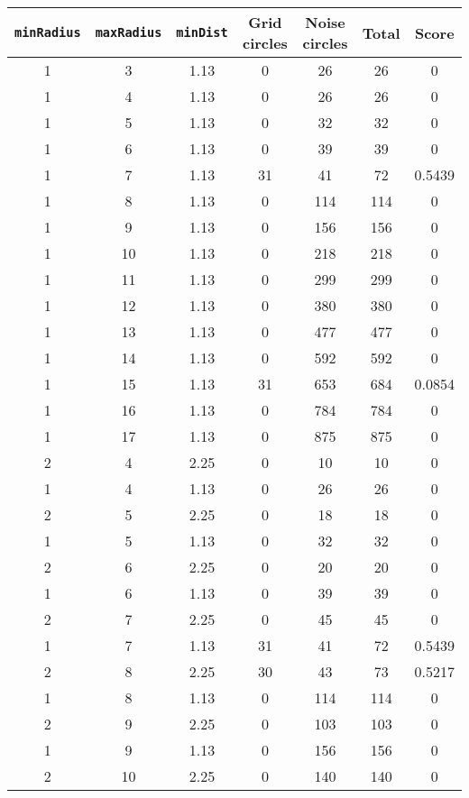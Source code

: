 \documentclass[letterpaper, 12pt]{article}
\begin{document}
\begin{longtable}{|c|c|c|c|c|c|c|}
\hline
\textbf{\texttt{minRadius}} & \textbf{\texttt{maxRadius}} & \textbf{\texttt{minDist}} & \textbf{Grid circles} & \textbf{Noise circles} & \textbf{Total} & \textbf{Score} \\
\hline
1 & 3 & 1.13 & 0 & 26 & 26 & 0 \\
\hline
1 & 4 & 1.13 & 0 & 26 & 26 & 0 \\
\hline
1 & 5 & 1.13 & 0 & 32 & 32 & 0 \\
\hline
1 & 6 & 1.13 & 0 & 39 & 39 & 0 \\
\hline
1 & 7 & 1.13 & 31 & 41 & 72 & 0.5439 \\
\hline
1 & 8 & 1.13 & 0 & 114 & 114 & 0 \\
\hline
1 & 9 & 1.13 & 0 & 156 & 156 & 0 \\
\hline
1 & 10 & 1.13 & 0 & 218 & 218 & 0 \\
\hline
1 & 11 & 1.13 & 0 & 299 & 299 & 0 \\
\hline
1 & 12 & 1.13 & 0 & 380 & 380 & 0 \\
\hline
1 & 13 & 1.13 & 0 & 477 & 477 & 0 \\
\hline
1 & 14 & 1.13 & 0 & 592 & 592 & 0 \\
\hline
1 & 15 & 1.13 & 31 & 653 & 684 & 0.0854 \\
\hline
1 & 16 & 1.13 & 0 & 784 & 784 & 0 \\
\hline
1 & 17 & 1.13 & 0 & 875 & 875 & 0 \\
\hline
2 & 4 & 2.25 & 0 & 10 & 10 & 0 \\
\hline
1 & 4 & 1.13 & 0 & 26 & 26 & 0 \\
\hline
2 & 5 & 2.25 & 0 & 18 & 18 & 0 \\
\hline
1 & 5 & 1.13 & 0 & 32 & 32 & 0 \\
\hline
2 & 6 & 2.25 & 0 & 20 & 20 & 0 \\
\hline
1 & 6 & 1.13 & 0 & 39 & 39 & 0 \\
\hline
2 & 7 & 2.25 & 0 & 45 & 45 & 0 \\
\hline
1 & 7 & 1.13 & 31 & 41 & 72 & 0.5439 \\
\hline
2 & 8 & 2.25 & 30 & 43 & 73 & 0.5217 \\
\hline
1 & 8 & 1.13 & 0 & 114 & 114 & 0 \\
\hline
2 & 9 & 2.25 & 0 & 103 & 103 & 0 \\
\hline
1 & 9 & 1.13 & 0 & 156 & 156 & 0 \\
\hline
2 & 10 & 2.25 & 0 & 140 & 140 & 0 \\

\end{longtable}
\end{document}
